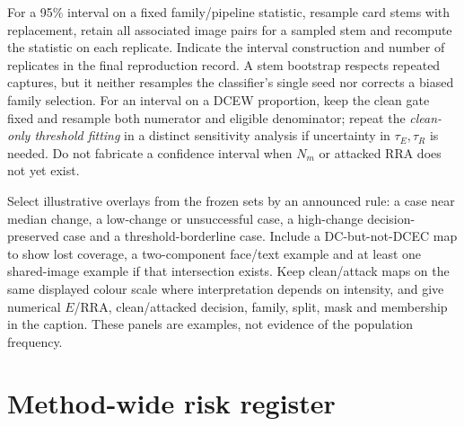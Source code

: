 For a 95\% interval on a fixed family/pipeline statistic, resample card stems with replacement, retain all associated image pairs for a sampled stem and recompute the statistic on each replicate. Indicate the interval construction and number of replicates in the final reproduction record. A stem bootstrap respects repeated captures, but it neither resamples the classifier's single seed nor corrects a biased family selection. For an interval on a DCEW proportion, keep the clean gate fixed and resample both numerator and eligible denominator; repeat the \emph{clean-only threshold fitting} in a distinct sensitivity analysis if uncertainty in $\tau_E,\tau_R$ is needed. Do not fabricate a confidence interval when $N_m$ or attacked RRA does not yet exist.

Select illustrative overlays from the frozen sets by an announced rule: a case near median change, a low-change or unsuccessful case, a high-change decision-preserved case and a threshold-borderline case. Include a DC-but-not-DCEC map to show lost coverage, a two-component face/text example and at least one shared-image example if that intersection exists. Keep clean/attack maps on the same displayed colour scale where interpretation depends on intensity, and give numerical $E$/RRA, clean/attacked decision, family, split, mask and membership in the caption. These panels are examples, not evidence of the population frequency.

\clearpage
\section{Method-wide risk register}
\label{app:method-risks}

